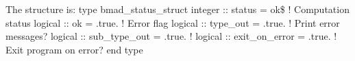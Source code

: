 The  structure is:
type bmad_status_struct
  integer :: status         = ok\$     ! Computation status 
  logical :: ok             = .true.   ! Error flag
  logical :: type_out       = .true.   ! Print error messages?
  logical :: sub_type_out   = .true.   ! 
  logical :: exit_on_error  = .true.   ! Exit program on error?
end type




